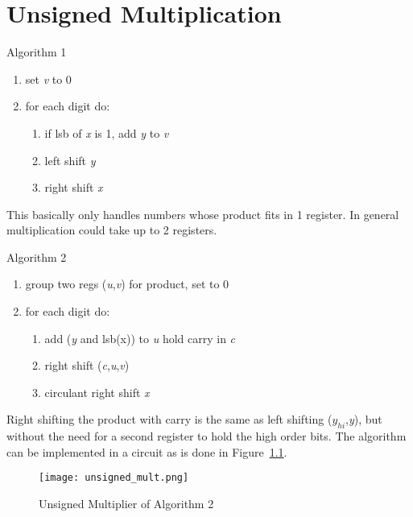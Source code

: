 \chapter{Unsigned Multiplication}

Algorithm 1
\begin{enumerate}
    \item set \emph{v} to 0
    \item for each digit do:
    \begin{enumerate}
        \item if lsb of \emph{x} is 1, add \emph{y} to \emph{v}
        \item left shift \emph{y}
        \item right shift \emph{x}
    \end{enumerate}
\end{enumerate}

This basically only handles numbers whose product fits in 1 register.  In general multiplication could take up to 2 registers.

\noindent
Algorithm 2
\begin{enumerate}
    \item group two regs (\emph{u},\emph{v}) for product, set to 0
    \item for each digit do:
    \begin{enumerate}
        \item  add (\emph{y} and lsb(x)) to \emph{u} hold carry in \emph{c}
        \item right shift (\emph{c},\emph{u},\emph{v})
        \item circulant right shift \emph{x}
    \end{enumerate}
\end{enumerate}

Right shifting the product with carry is the same as left shifting (\emph{$y_{hi}$},\emph{y}), but without the need for a second register to hold the high order bits.  The algorithm can be implemented in a circuit as is done in Figure~\ref{f-unsigned_mult}.

\begin{figure}
\caption{Unsigned Multiplier of Algorithm 2}\label{f-unsigned_mult}
\begin{center}
\texttt{[image: unsigned\_mult.png]}
\end{center}
\end{figure}

